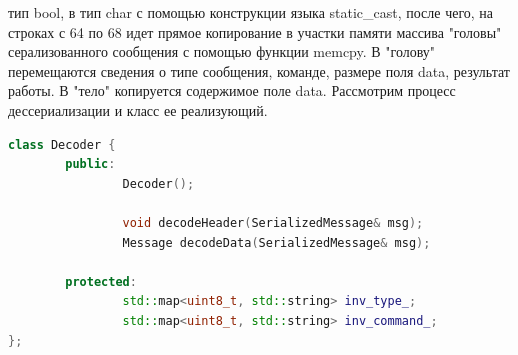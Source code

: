 \documentclass[a4paper, 14pt]{extreport}
\begin{document}
тип bool, в тип char с помощью конструкции языка static\_cast, после чего, на строках с 64 по 68 идет прямое копирование в участки 
памяти массива "головы" серализованного сообщения с помощью функции memcpy. В "голову" перемещаются сведения о типе сообщения, команде,
размере поля data, результат работы. В "тело" копируется содержимое поле data. Рассмотрим процесс дессериализации и класс ее реализующий.
\begin{lstlisting}[language=C++, frame=single, xleftmargin=15pt, caption={Заголовочный файл класса Decoder},label=DescriptiveLabel]
class Decoder {
        public:
                Decoder();
        
                void decodeHeader(SerializedMessage& msg);
                Message decodeData(SerializedMessage& msg);
        
        protected:
                std::map<uint8_t, std::string> inv_type_;
                std::map<uint8_t, std::string> inv_command_;
};
\end{lstlisting}
\end{document}
